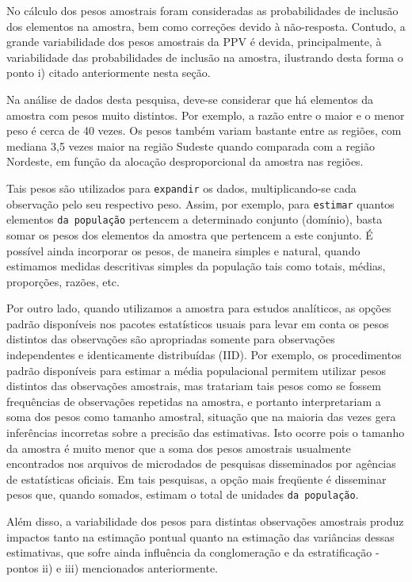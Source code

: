 \documentclass[]{book}
\theoremstyle{definition}
\theoremstyle{definition}
\theoremstyle{definition}
\theoremstyle{remark}
\begin{document}
No cálculo dos pesos amostrais foram consideradas as probabilidades de
inclusão dos elementos na amostra, bem como correções devido à
não-resposta. Contudo, a grande variabilidade dos pesos amostrais da PPV
é devida, principalmente, à variabilidade das probabilidades de inclusão
na amostra, ilustrando desta forma o ponto i) citado anteriormente nesta
seção.

Na análise de dados desta pesquisa, deve-se considerar que há elementos
da amostra com pesos muito distintos. Por exemplo, a razão entre o maior
e o menor peso é cerca de 40 vezes. Os pesos também variam bastante
entre as regiões, com mediana 3,5 vezes maior na região Sudeste quando
comparada com a região Nordeste, em função da alocação desproporcional
da amostra nas regiões.

Tais pesos são utilizados para \texttt{expandir} os dados,
multiplicando-se cada observação pelo seu respectivo peso. Assim, por
exemplo, para \texttt{estimar} quantos elementos \texttt{da\ população}
pertencem a determinado conjunto (domínio), basta somar os pesos dos
elementos da amostra que pertencem a este conjunto. É possível ainda
incorporar os pesos, de maneira simples e natural, quando estimamos
medidas descritivas simples da população tais como totais, médias,
proporções, razões, etc.

Por outro lado, quando utilizamos a amostra para estudos analíticos, as
opções padrão disponíveis nos pacotes estatísticos usuais para levar em
conta os pesos distintos das observações são apropriadas somente para
observações independentes e identicamente distribuídas (IID). Por
exemplo, os procedimentos padrão disponíveis para estimar a média
populacional permitem utilizar pesos distintos das observações
amostrais, mas tratariam tais pesos como se fossem frequências de
observações repetidas na amostra, e portanto interpretariam a soma dos
pesos como tamanho amostral, situação que na maioria das vezes gera
inferências incorretas sobre a precisão das estimativas. Isto ocorre
pois o tamanho da amostra é muito menor que a soma dos pesos amostrais
usualmente encontrados nos arquivos de microdados de pesquisas
disseminados por agências de estatísticas oficiais. Em tais pesquisas, a
opção mais freqüente é disseminar pesos que, quando somados, estimam o
total de unidades \texttt{da\ população}.

Além disso, a variabilidade dos pesos para distintas observações
amostrais produz impactos tanto na estimação pontual quanto na estimação
das variâncias dessas estimativas, que sofre ainda influência da
conglomeração e da estratificação - pontos ii) e iii) mencionados
anteriormente.
\end{document}
